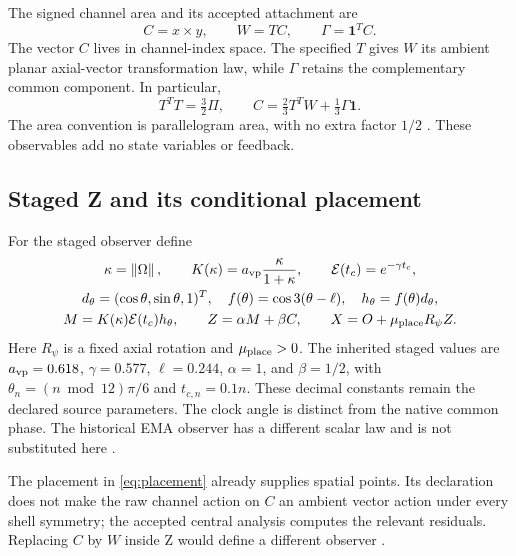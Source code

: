 \documentclass[11pt,a4paper]{article}
\numberwithin{equation}{section}
\theoremstyle{definition}
\theoremstyle{remark}
\newcommand{\one}{\mathbf 1}
\newcommand{\norm}[1]{\left\lVert#1\right\rVert}
\newcommand{\envelope}{\mathcal E}
\newcommand{\muplace}{\mu_{\rm place}}
\begin{document}
The signed channel area and its accepted attachment are
\begin{equation}\label{eq:chiral}
C=x\times y,\qquad W=TC,\qquad \Gamma=\one^TC.
\end{equation}
The vector $C$ lives in channel-index space. The specified $T$ gives $W$
its ambient planar axial-vector transformation law, while $\Gamma$ retains
the complementary common component. In particular,
\begin{equation}
T^TT=\tfrac32\Pi,\qquad
C=\tfrac23T^TW+\tfrac13\Gamma\one.
\end{equation}
The area convention is parallelogram area, with no extra factor $1/2$
\cite{PaperG}. These observables add no state variables or feedback.

\subsection{Staged Z and its conditional placement}
For the staged observer define
\begin{gather}
\kappa=\norm{\Omega},\qquad
K(\kappa)=a_{\rm vp}\frac{\kappa}{1+\kappa},\qquad
\envelope(t_c)=e^{-\gamma t_c},\label{eq:macrodefs}\\
d_\theta=(\cos\theta,\sin\theta,1)^T,\quad
f(\theta)=\cos3(\theta-\ell),\quad h_\theta=f(\theta)d_\theta,\notag\\
M=K(\kappa)\envelope(t_c)h_\theta,
\qquad Z=\alpha M+\beta C,\qquad
X=O+\muplace R_\psi Z.\label{eq:placement}
\end{gather}
Here $R_\psi$ is a fixed axial rotation and $\muplace>0$. The inherited
staged values are $a_{\rm vp}=0.618$, $\gamma=0.577$, $\ell=0.244$,
$\alpha=1$, and $\beta=1/2$, with
$\theta_n=(n\bmod12)\pi/6$ and $t_{c,n}=0.1n$. These decimal constants
remain the declared source parameters. The clock angle is distinct from the
native common phase. The historical EMA observer has a different scalar law
and is not substituted here \cite{Central,PaperE}.

The placement in \eqref{eq:placement} already supplies spatial points.
Its declaration does not make the raw channel action on $C$ an ambient
vector action under every shell symmetry; the accepted central analysis
computes the relevant residuals. Replacing $C$ by $W$ inside Z would define
a different observer \cite{Central}.
\end{document}

